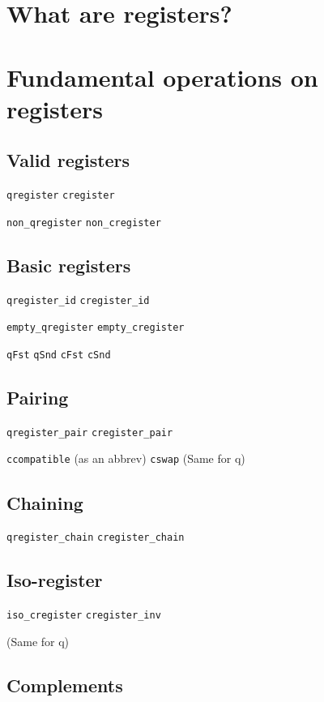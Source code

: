 \documentclass{article}
\begin{document}
\section{What are registers?}

\TODOQ{}

\section{Fundamental operations on registers}

\subsection{Valid registers}

\verb|qregister|
\verb|cregister|

\verb|non_qregister|
\verb|non_cregister|

\subsection{Basic registers}

\verb|qregister_id|
\verb|cregister_id|

\verb|empty_qregister|
\verb|empty_cregister|

\verb|qFst| \verb|qSnd|
\verb|cFst| \verb|cSnd|


\subsection{Pairing}

\verb|qregister_pair|
\verb|cregister_pair|

\verb|ccompatible| (as an abbrev)
\verb|cswap|
(Same for q)


\subsection{Chaining}

\verb|qregister_chain|
\verb|cregister_chain|

\subsection{Iso-register}

\verb|iso_cregister|
\verb|cregister_inv|


(Same for q)

\subsection{Complements}
\end{document}

